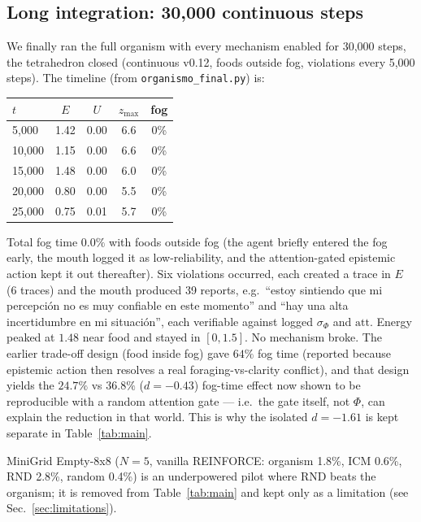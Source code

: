 \documentclass[11pt,a4paper]{article}
\begin{document}
\subsection{Long integration: 30,000 continuous steps}

We finally ran the full organism with every mechanism enabled for 30,000 steps, the tetrahedron closed (continuous v0.12, foods outside fog, violations every 5,000 steps). The timeline (from \texttt{organismo\_final.py}) is:

\begin{center}
\begin{tabular}{lcccc}
\toprule
$t$ & $E$ & $U$ & $z_{\max}$ & fog \\
\midrule
5,000 & 1.42 & 0.00 & 6.6 & 0\% \\
10,000 & 1.15 & 0.00 & 6.6 & 0\% \\
15,000 & 1.48 & 0.00 & 6.0 & 0\% \\
20,000 & 0.80 & 0.00 & 5.5 & 0\% \\
25,000 & 0.75 & 0.01 & 5.7 & 0\% \\
\bottomrule
\end{tabular}
\end{center}

Total fog time $0.0\%$ with foods outside fog (the agent briefly entered the fog early, the mouth logged it as low-reliability, and the attention-gated epistemic action kept it out thereafter). Six violations occurred, each created a trace in $E$ (6 traces) and the mouth produced 39 reports, e.g.\ ``estoy sintiendo que mi percepci\'on no es muy confiable en este momento'' and ``hay una alta incertidumbre en mi situaci\'on'', each verifiable against logged $\sigma_\Phi$ and $\mathrm{att}$. Energy peaked at $1.48$ near food and stayed in $[0,1.5]$. No mechanism broke. The earlier trade-off design (food inside fog) gave $64\%$ fog time (reported because epistemic action then resolves a real foraging-vs-clarity conflict), and that design yields the $24.7\%$ vs $36.8\%$ ($d=-0.43$) fog-time effect now shown to be reproducible with a random attention gate --- i.e.\ the gate itself, not $\Phi$, can explain the reduction in that world. This is why the isolated $d=-1.61$ is kept separate in Table~\ref{tab:main}.

MiniGrid Empty-8x8 ($N=5$, vanilla REINFORCE: organism 1.8\%, ICM 0.6\%, RND 2.8\%, random 0.4\%) is an underpowered pilot where RND beats the organism; it is removed from Table~\ref{tab:main} and kept only as a limitation (see Sec.~\ref{sec:limitations}).
\end{document}
